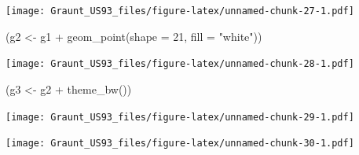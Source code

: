 \documentclass[
]{article}
\newenvironment{Shaded}{\begin{snugshade}}{\end{snugshade}}
\newcommand{\AttributeTok}[1]{\textcolor[rgb]{0.77,0.63,0.00}{#1}}
\newcommand{\DecValTok}[1]{\textcolor[rgb]{0.00,0.00,0.81}{#1}}
\newcommand{\FunctionTok}[1]{\textcolor[rgb]{0.00,0.00,0.00}{#1}}
\newcommand{\NormalTok}[1]{#1}
\newcommand{\OtherTok}[1]{\textcolor[rgb]{0.56,0.35,0.01}{#1}}
\newcommand{\SpecialCharTok}[1]{\textcolor[rgb]{0.00,0.00,0.00}{#1}}
\newcommand{\StringTok}[1]{\textcolor[rgb]{0.31,0.60,0.02}{#1}}
\begin{document}
\texttt{[image: Graunt\_US93\_files/figure-latex/unnamed-chunk-27-1.pdf]}

\begin{Shaded}
\begin{Highlighting}[]
\NormalTok{(g2 }\OtherTok{\textless{}{-}}\NormalTok{ g1 }\SpecialCharTok{+}
  \FunctionTok{geom\_point}\NormalTok{(}\AttributeTok{shape =} \DecValTok{21}\NormalTok{, }\AttributeTok{fill =} \StringTok{"white"}\NormalTok{))}
\end{Highlighting}
\end{Shaded}

\texttt{[image: Graunt\_US93\_files/figure-latex/unnamed-chunk-28-1.pdf]}

\begin{Shaded}
\begin{Highlighting}[]
\NormalTok{(g3 }\OtherTok{\textless{}{-}}\NormalTok{ g2 }\SpecialCharTok{+}
  \FunctionTok{theme\_bw}\NormalTok{())}
\end{Highlighting}
\end{Shaded}

\texttt{[image: Graunt\_US93\_files/figure-latex/unnamed-chunk-29-1.pdf]}

\begin{Shaded}
\end{Shaded}

\texttt{[image: Graunt\_US93\_files/figure-latex/unnamed-chunk-30-1.pdf]}

\begin{Shaded}
\end{Shaded}
\end{document}
